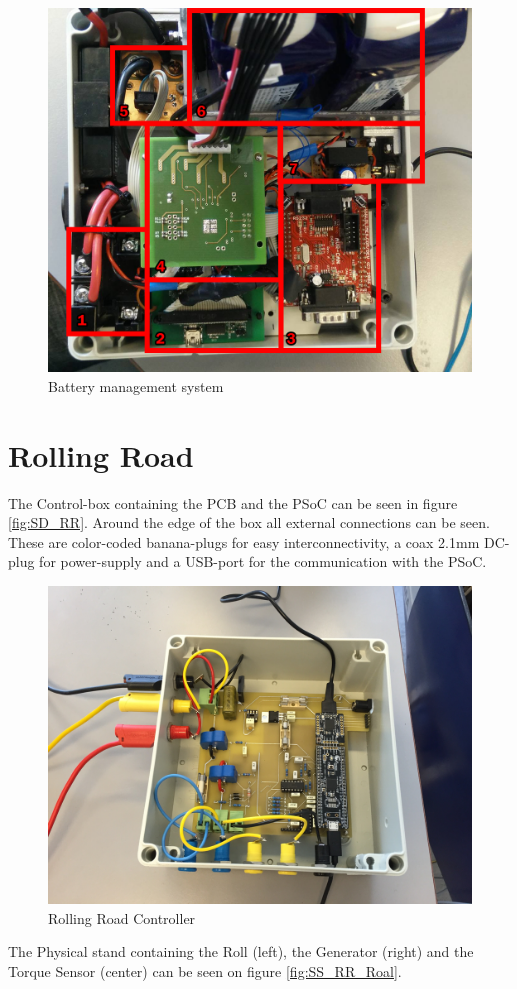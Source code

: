 \begin{figure}[H]
	\centering
	\includegraphics[width=0.7\linewidth]{SubPages/Images/SD_BMS}
	\caption{Battery management system}
	\label{fig:SD_BMS}
\end{figure}

\section{Rolling Road}
The Control-box containing the PCB and the PSoC can be seen in figure \vref{fig:SD_RR}. Around the edge of the box all external connections can be seen. These are color-coded banana-plugs for easy interconnectivity, a coax 2.1mm DC-plug for power-supply and a USB-port for the communication with the PSoC. 

\begin{figure}[H]
	\centering
	\includegraphics[width=0.7\linewidth]{SubPages/Images/SD_RR}
	\caption{Rolling Road Controller}
	\label{fig:SD_RR}
\end{figure}

\newpage
The Physical stand containing the Roll (left), the Generator (right) and the Torque Sensor (center) can be seen on figure \vref{fig:SS_RR_Roal}.

